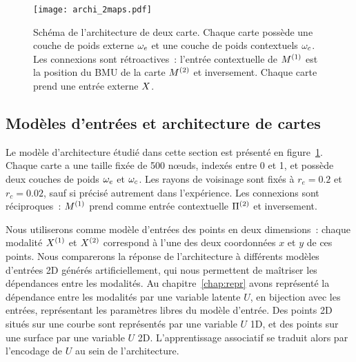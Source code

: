 \documentclass[../main]{subfiles}
\begin{document}
\begin{figure}[ht]
	\centering\texttt{[image: archi\_2maps.pdf]}
	\caption{Schéma de l'architecture de deux carte. Chaque carte possède une couche de poids externe $\omega_e$ et une couche de poids contextuels $\omega_c$. Les connexions sont rétroactives~: l'entrée contextuelle de $M^{({1})}$ est la position du BMU de la carte $M^{({2})}$ et inversement. 
	Chaque carte prend une entrée externe $X$.\label{fig:archis}}
\end{figure}

\subsection{Modèles d'entrées et architecture de cartes}

Le modèle d'architecture étudié dans cette section est présenté en figure~\ref{fig:archis}.
Chaque carte a une taille fixée de 500 n\oe{}uds, indexés entre 0 et 1, et possède deux couches de poids $\omega_e$ et $\omega_c$. Les rayons de voisinage sont fixés à $r_e = 0.2$ et $r_c = 0.02$, sauf si précisé autrement dans l'expérience. Les connexions sont réciproques~: $M^{({1})}$ prend comme entrée contextuelle $\Pi^{({2})}$ et inversement.

Nous utiliserons comme modèle d'entrées des points en deux dimensions~: chaque modalité $X^{({1})}$ et $X^{({2})}$ correspond à l'une des deux coordonnées $x$ et $y$ de ces points. Nous comparerons la réponse de l'architecture à différents modèles d'entrées 2D générés artificiellement, qui nous permettent de maîtriser les dépendances entre les modalités.
Au chapitre~\ref{chap:repr} avons représenté la dépendance entre les modalités par une variable latente $U$, en bijection avec les entrées, représentant les paramètres libres du modèle d'entrée. 
Des points 2D situés sur une courbe sont représentés par une variable $U$ 1D, et des points sur une surface par une variable $U$ 2D. L'apprentissage associatif se traduit alors par l'encodage de $U$ au sein de l'architecture.
\end{document}
